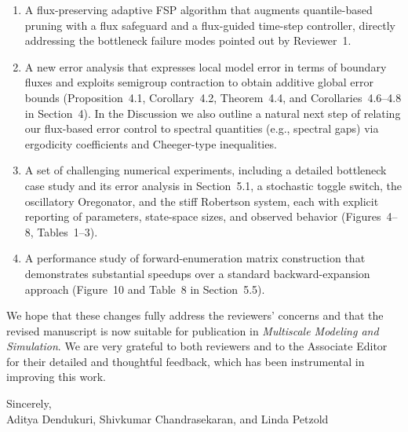 \documentclass[11pt]{article}
\begin{document}
\begin{enumerate}
  \item A flux-preserving adaptive FSP algorithm that augments quantile-based
        pruning with a flux safeguard and a flux-guided time-step controller,
        directly addressing the bottleneck failure modes pointed out by
        Reviewer~1.
  \item A new error analysis that expresses local model error in terms of
        boundary fluxes and exploits semigroup contraction to obtain additive
        global error bounds (Proposition~4.1, Corollary~4.2, Theorem~4.4, and
        Corollaries~4.6--4.8 in Section~4). In the Discussion we also outline a
        natural next step of relating our flux-based error control to spectral
        quantities (e.g., spectral gaps) via ergodicity coefficients and
        Cheeger-type inequalities.
  \item A set of challenging numerical experiments, including a detailed
        bottleneck case study and its error analysis in Section~5.1, a stochastic
        toggle switch, the oscillatory Oregonator, and the stiff Robertson system,
        each with explicit reporting of parameters, state-space sizes, and
        observed behavior (Figures~4--8, Tables~1--3).
  \item A performance study of forward-enumeration matrix construction that
        demonstrates substantial speedups over a standard backward-expansion
        approach (Figure~10 and Table~8 in Section~5.5).
\end{enumerate}

We hope that these changes fully address the reviewers’ concerns and that the
revised manuscript is now suitable for publication in \emph{Multiscale Modeling
and Simulation}. We are very grateful to both reviewers and to the Associate
Editor for their detailed and thoughtful feedback, which has been instrumental in
improving this work.

\vspace{1em}
\noindent Sincerely,\\[0.5em]
Aditya Dendukuri, Shivkumar Chandrasekaran, and Linda Petzold
\end{document}
